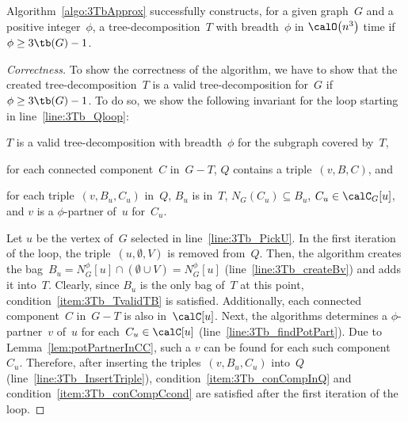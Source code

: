 \begin{theorem}
Algorithm~\ref{algo:3TbApprox} successfully constructs, for a given graph~\( G \) and a positive integer~\( \phi \), a tree-decomposition~\( T \) with breadth~\( \phi \) in \( \calO \big( n^3 \big) \) time if \( \phi \geq 3 \tb(G) - 1 \).
\end{theorem}

\begin{proof}
    [Correctness]
To show the correctness of the algorithm, we have to show that the created tree-decomposition~$T$ is a valid tree-decomposition for~$G$ if $\phi \geq 3 \tb(G) - 1$.
To do so, we show the following invariant for the loop starting in line~\ref{line:3Tb_Qloop}:
\begin{enumerate*}[(i),mode=unboxed]
    \item
        \label{item:3Tb_TvalidTB}
        $T$ is a valid tree-decomposition with breadth~$\phi$ for the subgraph covered by~$T$,
    \item
        \label{item:3Tb_conCompInQ}
        for each connected component~$C$ in~$G - T$, $Q$ contains a triple~$(v, B, C)$, and
    \item
        \label{item:3Tb_conCompCcond}
        for each triple~$(v, B_u, C_u)$ in~$Q$, $B_u$ is in~$T$, $N_G(C_u) \subseteq B_u$, $C_u \in \calC_G[u]$, and $v$ is a $\phi$-partner of~$u$ for~$C_u$.
\end{enumerate*}

Let $u$ be the vertex of~$G$ selected in line~\ref{line:3Tb_PickU}.
In the first iteration of the loop, the triple~$(u, \emptyset, V)$ is removed from~$Q$.
Then, the algorithm creates the bag~$B_u = N_G^\phi[u] \cap (\emptyset \cup V) = N_G^\phi[u]$ (line~\ref{line:3Tb_createBv}) and adds it into~$T$.
Clearly, since $B_u$ is the only bag of~$T$ at this point, condition~\ref{item:3Tb_TvalidTB} is satisfied.
Additionally, each connected component~$C$ in~$G - T$ is also in~$\calC[u]$.
Next, the algorithms determines a $\phi$-partner~$v$ of~$u$ for each~$C_u \in \calC[u]$ (line~\ref{line:3Tb_findPotPart}).
Due to Lemma~\ref{lem:potPartnerInCC}, such a $v$ can be found for each such component~$C_u$.
Therefore, after inserting the triples~$(v, B_u, C_u)$ into~$Q$ (line~\ref{line:3Tb_InsertTriple}), condition~\ref{item:3Tb_conCompInQ} and condition~\ref{item:3Tb_conCompCcond} are satisfied after the first iteration of the loop.


\end{proof}
